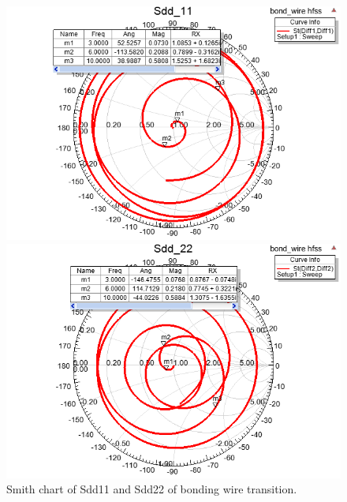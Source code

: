 \documentclass{book}  %
\begin{document}
\begin{paper}
\begin{figure}[htbp!]
	\centering	
	\begin{minipage}[tb]{0.5\textwidth}
		\centering	
		\includegraphics[width=\textwidth]{./img/PCB/Bonding_Wire/Sdd11_smith.png}
	\end{minipage}%
	\begin{minipage}[tb]{0.5\textwidth}
		\centering	
		\includegraphics[width=\textwidth]{./img/PCB/Bonding_Wire/Sdd22_smith.png}
	\end{minipage}
	\label{fig:bonding_wire_S_smith}
	\caption{Smith chart of Sdd11 and Sdd22 of bonding wire transition.}
\end{figure}


\end{paper}
\end{document}
